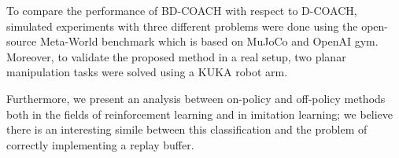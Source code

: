 \vspace{3mm} %

To compare the performance of BD-COACH with respect to D-COACH, simulated experiments with three different problems were done using the open-source Meta-World benchmark which is based on MuJoCo and OpenAI gym. Moreover, to validate the proposed method in a real setup, two planar manipulation tasks were solved using a KUKA robot arm. 

\vspace{3mm} %


Furthermore, we present an analysis between on-policy and off-policy methods both in the fields of reinforcement learning and in imitation learning; we believe there is an interesting simile between this classification and the problem of correctly implementing a replay buffer.